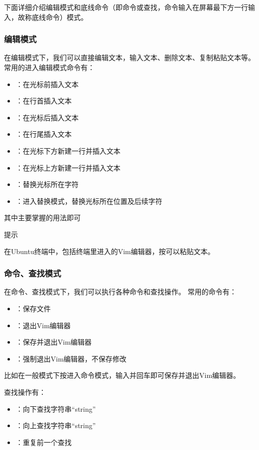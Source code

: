 下面详细介绍编辑模式和底线命令（即命令或查找，命令输入在屏幕最下方一行输入，故称底线命令）模式。

\subsubsection{编辑模式}
在编辑模式下，我们可以直接编辑文本，输入文本、删除文本、复制粘贴文本等。
常用的进入编辑模式命令有：
\begin{itemize}
\item {}：在光标前插入文本
\item {}：在行首插入文本
\item {}：在光标后插入文本
\item {}：在行尾插入文本
\item {}：在光标下方新建一行并插入文本
\item {}：在光标上方新建一行并插入文本
\item {}：替换光标所在字符
\item {}：进入替换模式，替换光标所在位置及后续字符
\end{itemize}

其中主要掌握的用法即可

\begin{zy}
提示

在Ubuntu终端中，包括终端里进入的Vim编辑器，按可以粘贴文本。
\end{zy}

\subsubsection{命令、查找模式}
在命令、查找模式下，我们可以执行各种命令和查找操作。
常用的命令有：
\begin{itemize}
\item {}：保存文件
\item {}：退出Vim编辑器
\item {}：保存并退出Vim编辑器
\item {}：强制退出Vim编辑器，不保存修改
\end{itemize}

比如在一般模式下按\code{:}进入命令模式，输入并回车即可保存并退出Vim编辑器。

查找操作有：
\begin{itemize}
\item {}：向下查找字符串“string”
\item {}：向上查找字符串“string”
\item {}：重复前一个查找
\end{itemize}

